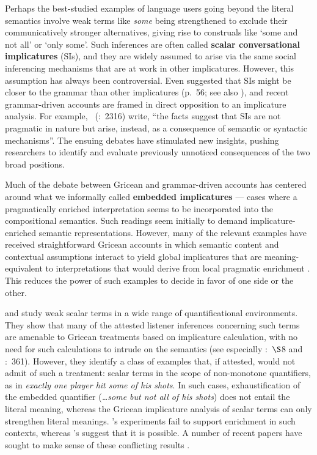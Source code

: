 \documentclass[leqno,12pt]{article}
\newcommand{\pgcitealt}[2]{\citealt{#1}:~#2}
\newcommand{\seccitealt}[2]{\citealt{#1}:~$\S$#2}
\newcommand{\pgcitet}[2]{\citeauthor{#1}~(\citeyear{#1}:~#2)}
\newcommand{\word}[1]{\emph{#1}}
\newcommand{\tech}[1]{\textbf{#1}}
\begin{document}
{Perhaps the best-studied examples of language users going beyond the
literal semantics involve weak terms like \word{some} being
strengthened to exclude their communicatively stronger alternatives,
giving rise to construals like `some and not all' or `only some'.
Such inferences are often called \tech{scalar conversational
  implicatures} (SIs), and they are widely assumed to arise via the
same social inferencing mechanisms that are at work in other
implicatures.  However, this assumption has always been
controversial. Even \citeauthor{Grice75} suggested that SIs might be
closer to the grammar than other implicatures (p.~56; see also
\citealt{Levinson00,Sperber95,Bach06}), and recent grammar-driven
accounts are framed in direct opposition to an implicature analysis.
For example, \pgcitet{ChierchiaFoxSpector08}{2316} write, ``the facts
suggest that SIs are not pragmatic in nature but arise, instead, as a
consequence of semantic or syntactic mechanisms''. The ensuing debates
have stimulated new insights, pushing researchers to identify and
evaluate previously unnoticed consequences of the two broad positions.

Much of the debate between Gricean and grammar-driven accounts has
centered around what we informally called \tech{embedded implicatures}
--- cases where a pragmatically enriched interpretation seems to be
incorporated into the compositional semantics. Such readings seem
initially to demand implicature-enriched semantic representations.
However, many of the relevant examples have received straightforward
Gricean accounts in which semantic content and contextual assumptions
interact to yield global implicatures that are meaning-equivalent to
interpretations that would derive from local pragmatic enrichment
\citep{Russell06,Geurts09,Geurts:2011}. This reduces the power of such
examples to decide in favor of one side or the other.

\citet{Geurts:Pouscoulous:2009} and \citet{Chemla:Spector:2011} study
weak scalar terms in a wide range of quantificational environments.
They show that many of the attested listener inferences concerning
such terms are amenable to Gricean treatments based on implicature
calculation, with no need for such calculations to intrude on the
semantics (see especially \seccitealt{Geurts:Pouscoulous:2009}{8} and
\pgcitealt{Chemla:Spector:2011}{361}).  However, they identify a class
of examples that, if attested, would not admit of such a treatment:
scalar terms in the scope of non-monotone quantifiers, as in
\word{exactly one player hit some of his shots}. In such cases,
exhaustification of the embedded quantifier (\word{\ldots some but not
  all of his shots}) does not entail the literal meaning, whereas the
Gricean implicature analysis of scalar terms can only strengthen
literal meanings. \citeauthor{Geurts:Pouscoulous:2009}'s experiments
fail to support enrichment in such contexts, whereas
\citeauthor{Chemla:Spector:2011}'s suggest that it is possible. A
number of recent papers have sought to make sense of these conflicting
results
\citep{Clifton:Dube:2010,geurts-vantiel:2013:scalar,vanTiel:2014}.

}
\end{document}
